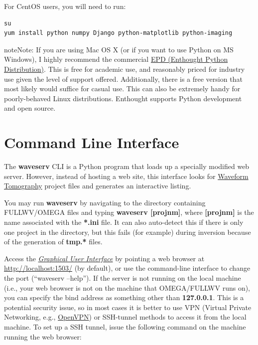 \documentclass[letterpaper,10pt,english]{sphinxmanual}
\begin{document}
For CentOS users, you will need to run:

\begin{Verbatim}[commandchars=@\[\]]
su
yum install python numpy Django python-matplotlib python-imaging
\end{Verbatim}

\begin{notice}{note}{Note:}
If you are using Mac OS X (or if you want to use Python on MS Windows), I highly recommend the commercial \href{http://www.enthought.com/products/epd.php}{EPD (Enthought Python Distribution)}.  This is free for academic use, and reasonably priced for industry use given the level of support offered.  Additionally, there is a free version that most likely would suffice for casual use.  This can also be extremely handy for poorly-behaved Linux distributions.  Enthought supports Python development and open source.
\end{notice}


\chapter{Command Line Interface}
\label{cli:command-line-interface}\label{cli::doc}\label{cli:cli}
The \textbf{waveserv} CLI is a Python program that loads up a specially modified web server.  However, instead of hosting a web site, this interface looks for \href{http://orion.es.uwo.ca/index.php/Waveform\_Tomography}{Waveform Tomography} project files and generates an interactive listing.

You may run \textbf{waveserv} by navigating to the directory containing FULLWV/OMEGA files and typing \textbf{waveserv {[}projnm{]}}, where \textbf{{[}projnm{]}} is the name associated with the \textbf{*.ini} file.  It can also auto-detect this if there is only one project in the directory, but this fails (for example) during inversion because of the generation of \textbf{tmp.*} files.

Access the {\hyperref[gui:gui]{\emph{Graphical User Interface}}} by pointing a web browser at \href{http://localhost:1503/}{http://localhost:1503/} (by default), or use the command-line interface to change the port (``waveserv --help'').  If the server is not running on the local machine (i.e., your web browser is not on the machine that OMEGA/FULLWV runs on), you can specify the bind address as something other than \textbf{127.0.0.1}.  This is a potential security issue, so in most cases it is better to use VPN (Virtual Private Networking, e.g., \href{http://openvpn.net/}{OpenVPN}) or SSH-tunnel methods to access it from the local machine.  To set up a SSH tunnel, issue the following command on the machine running the web browser:
\end{document}
